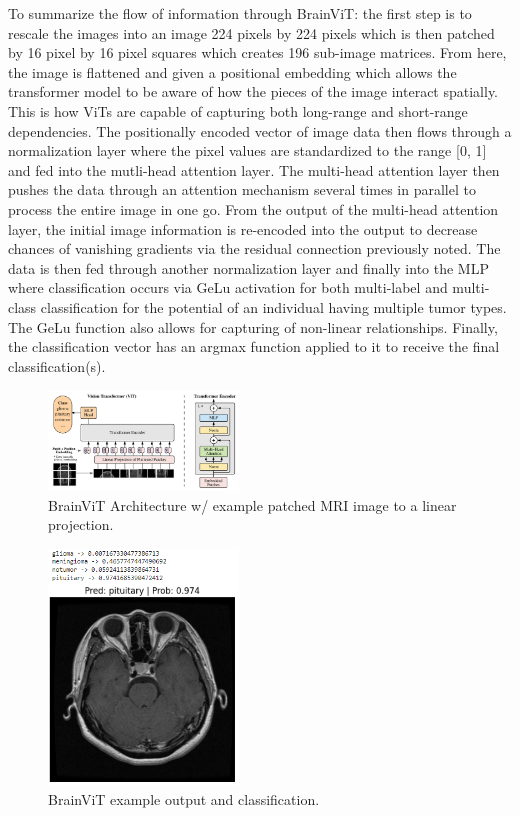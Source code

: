\documentclass[conference]{IEEEtran}
\begin{document}
To summarize the flow of information through BrainViT: the first step is to rescale the images into an image 224 pixels by 224 pixels which is then patched by 16 pixel by 16 pixel squares which creates 196 sub-image matrices. From here, the image is flattened and given a positional embedding which allows the transformer model to be aware of how the pieces of the image interact spatially. This is how ViTs are capable of capturing both long-range and short-range dependencies. The positionally encoded vector of image data then flows through a normalization layer where the pixel values are standardized to the range [0, 1] and fed into the mutli-head attention layer. The multi-head attention layer then pushes the data through an attention mechanism several times in parallel to process the entire image in one go. From the output of the multi-head attention layer, the initial image information is re-encoded into the output to decrease chances of vanishing gradients via the residual connection previously noted. The data is then fed through another normalization layer and finally into the MLP where classification occurs via GeLu activation for both multi-label and multi-class classification for the potential of an individual having multiple tumor types. The GeLu function also allows for capturing of non-linear relationships. Finally, the classification vector has an argmax function applied to it to receive the final classification(s).  

\begin{figure}[h]
    \centering
    \includegraphics[width=0.45\textwidth]{arch.png}
    \caption{BrainViT Architecture w/ example patched MRI image to a linear projection.}
    \label{fig:1}
\end{figure}

\begin{figure}[h]
    \centering
    \includegraphics[width=0.45\textwidth]{example output.PNG}
    \caption{BrainViT example output and classification.}
    \label{fig:output}
\end{figure}
\end{document}
